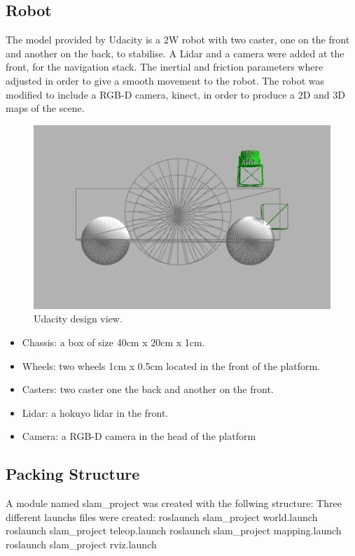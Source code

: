 \documentclass[10pt,journal,compsoc]{IEEEtran}
\begin{document}
\subsection{Robot}
The model provided by Udacity is a 2W robot with two caster, one on the front and another on the back, to stabilise. A Lidar and a camera were added at the front, for the navigation stack. The inertial and friction parameters where adjusted in order to give a smooth movement to the robot. The robot was modified to include a RGB-D camera, kinect, in order to produce a 2D and 3D maps of the scene.
\begin{figure}[h]
\centering
\includegraphics[scale=0.33]{udacity-design-2}
\caption{Udacity design view.}
\label{fig:mesh1}
\end{figure}
\begin{itemize}
\item Chassis: a box of size 40cm x 20cm x 1cm.
\item Wheels: two wheels 1cm x 0.5cm located in the front of the platform.
\item Casters: two caster one the back and another on the front.
\item Lidar: a hokuyo lidar in the front.
\item Camera: a RGB-D camera in the head of the platform
\end{itemize}
\subsection{Packing Structure}
A module named slam\_project was created with the follwing structure:
Three different launchs files were created:
roslaunch slam\_project world.launch
roslaunch slam\_project teleop.launch
roslaunch slam\_project mapping.launch
roslaunch slam\_project rviz.launch
\end{document}
